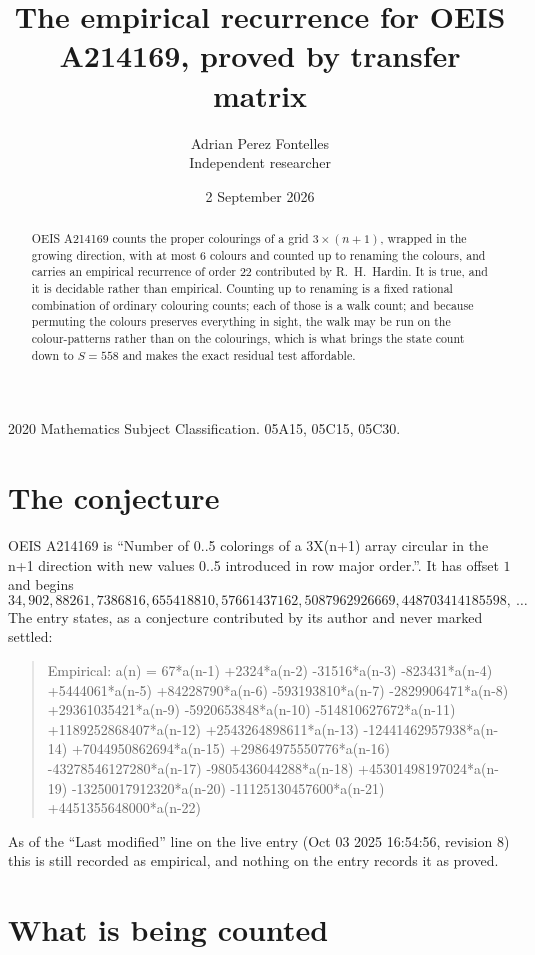 \documentclass[11pt,a4paper]{article}
\title{The empirical recurrence for OEIS A214169, proved by transfer matrix}
\author{Adrian Perez Fontelles\\ \small Independent researcher}
\date{2 September 2026}
\theoremstyle{plain}
\theoremstyle{definition}
\begin{document}
\maketitle

\begin{abstract}
OEIS A214169 counts the proper colourings of a grid $3\times(n+1)$, wrapped in the growing direction, with at most $6$ colours and
counted up to renaming the colours, and carries an empirical recurrence of order $22$
contributed by R.~H.~Hardin. It is true, and it is decidable rather than empirical. Counting
up to renaming is a fixed rational combination of ordinary colouring counts; each of those is
a walk count; and because permuting the colours preserves everything in sight, the walk may be
run on the colour-patterns rather than on the colourings, which is what brings the state count
down to $S=558$ and makes the exact residual test affordable.
\end{abstract}

\noindent\small 2020 Mathematics Subject Classification. 05A15, 05C15, 05C30.\normalsize

\section{The conjecture}

OEIS A214169 is ``Number of 0..5 colorings of a 3X(n+1) array circular in the n+1 direction with new values 0..5 introduced in row major order.''. It has offset $1$ and begins
\[
34, 902, 88261, 7386816, 655418810, 57661437162, 5087962926669, 448703414185598,\ \dots
\]
The entry states, as a conjecture contributed by its author and never marked settled:
\begin{quote}
Empirical: a(n) = 67*a(n-1) +2324*a(n-2) -31516*a(n-3) -823431*a(n-4) +5444061*a(n-5) +84228790*a(n-6) -593193810*a(n-7) -2829906471*a(n-8) +29361035421*a(n-9) -5920653848*a(n-10) -514810627672*a(n-11) +1189252868407*a(n-12) +2543264898611*a(n-13) -12441462957938*a(n-14) +7044950862694*a(n-15) +29864975550776*a(n-16) -43278546127280*a(n-17) -9805436044288*a(n-18) +45301498197024*a(n-19) -13250017912320*a(n-20) -11125130457600*a(n-21) +4451355648000*a(n-22)
\end{quote}
As of the ``Last modified'' line on the live entry (Oct 03 2025 16:54:56, revision 8) this is still
recorded as empirical, and nothing on the entry records it as proved.

\section{What is being counted}
\end{document}
